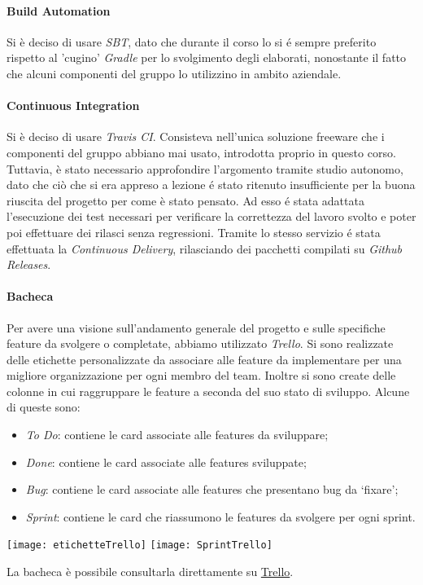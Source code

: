 \paragraph{Build Automation}
Si è deciso di usare \textit{SBT}, dato che durante il corso lo si é sempre preferito rispetto al 'cugino' \textit{Gradle} per lo svolgimento degli elaborati, nonostante il fatto che alcuni componenti del gruppo lo utilizzino in ambito aziendale.

\paragraph{Continuous Integration}
Si è deciso di usare \textit{Travis CI}.
Consisteva nell'unica soluzione freeware che i componenti del gruppo abbiano mai usato, introdotta proprio in questo corso.
Tuttavia, è stato necessario approfondire l'argomento tramite studio autonomo, dato che ciò che si era appreso a lezione é stato ritenuto insufficiente per la buona riuscita del progetto per come è stato pensato.
Ad esso é stata adattata l'esecuzione dei test necessari per verificare la correttezza del lavoro svolto e poter poi effettuare dei rilasci senza regressioni.
Tramite lo stesso servizio é stata effettuata la \textit{Continuous Delivery}, rilasciando dei pacchetti compilati su \textit{Github Releases}.

\paragraph{Bacheca}
Per avere una visione sull’andamento generale del progetto e sulle specifiche feature da svolgere o completate, abbiamo utilizzato \textit{Trello}.
\newline
Si sono realizzate delle etichette personalizzate da associare alle feature da implementare per una migliore organizzazione per ogni membro del team.
Inoltre si sono create delle colonne in cui raggruppare le feature a seconda del suo stato di sviluppo.
Alcune di queste sono:
\begin{itemize}
    \item \textit{To Do}: contiene le card associate alle features da sviluppare;
    \item \textit{Done}: contiene le card associate alle features sviluppate;
    \item \textit{Bug}: contiene le card associate alle features che presentano bug da ‘fixare’;
    \item \textit{Sprint}: contiene le card che riassumono le features da svolgere per ogni sprint.
\end{itemize}
\begin{center}
    \texttt{[image: etichetteTrello]}
    \texttt{[image: SprintTrello]}
\end{center}
La bacheca è possibile consultarla direttamente su \textunderscore \href{https://trello.com/b/Nk4j3Kuf/pps}{Trello}.

